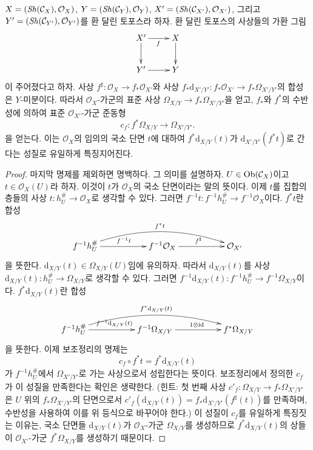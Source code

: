 \begin{lemma}
\label{lemma-functoriality-differentials-ringed-topoi}
$X = (\mathop{\mathit{Sh}}\nolimits(\mathcal{C}_X), \mathcal{O}_X)$,
$Y = (\mathop{\mathit{Sh}}\nolimits(\mathcal{C}_Y), \mathcal{O}_Y)$,
$X' = (\mathop{\mathit{Sh}}\nolimits(\mathcal{C}_{X'}), \mathcal{O}_{X'})$, 그리고
$Y' = (\mathop{\mathit{Sh}}\nolimits(\mathcal{C}_{Y'}), \mathcal{O}_{Y'})$를 환 달린 토포스라 하자.
환 달린 토포스의 사상들의 가환 그림
$$
\xymatrix{
X' \ar[d] \ar[r]_f & X \ar[d] \\
Y' \ar[r] & Y
}
$$
이 주어졌다고 하자. 사상
$f^\sharp : \mathcal{O}_X \to f_*\mathcal{O}_{X'}$와 사상
$f_*\text{d}_{X'/Y'} : f_*\mathcal{O}_{X'} \to f_*\Omega_{X'/Y'}$의
합성은 $Y$-미분이다. 따라서 $\mathcal{O}_X$-가군의 표준 사상
$\Omega_{X/Y} \to f_*\Omega_{X'/Y'}$을 얻고, $f_*$와 $f^*$의
수반성에 의하여 표준 $\mathcal{O}_{X'}$-가군 준동형
$$
c_f : f^*\Omega_{X/Y} \longrightarrow \Omega_{X'/Y'}.
$$
을 얻는다. 이는 $\mathcal{O}_X$의 임의의 국소 단면 $t$에 대하여
$f^*\text{d}_{X/Y}(t)$가 $\text{d}_{X'/Y'}(f^* t)$로 간다는 성질로
유일하게 특징지어진다.
\end{lemma}

\begin{proof}
마지막 명제를 제외하면 명백하다. 그 의미를 설명하자.
$U \in \mathop{\mathrm{Ob}}\nolimits(\mathcal{C}_X)$이고 $t \in \mathcal{O}_X(U)$라 하자.
이것이 $t$가 $\mathcal{O}_X$의 국소 단면이라는 말의 뜻이다.
이제 $t$를 집합의 층들의 사상
$t : h_U^\# \to \mathcal{O}_X$로 생각할 수 있다. 그러면
$f^{-1}t : f^{-1}h_U^\# \to f^{-1}\mathcal{O}_X$이다.
$f^*t$란 합성
$$
\xymatrix{
f^{-1}h_U^\# \ar[rr]^{f^{-1}t} \ar@/^4ex/[rrrr]^{f^*t} & &
f^{-1}\mathcal{O}_X \ar[rr]^{f^\sharp} & &
\mathcal{O}_{X'}
}
$$
을 뜻한다. $\text{d}_{X/Y}(t) \in \Omega_{X/Y}(U)$임에 유의하자.
따라서 $\text{d}_{X/Y}(t)$를 사상
$\text{d}_{X/Y}(t) : h_U^\# \to \Omega_{X/Y}$로 생각할 수 있다.
그러면 $f^{-1}\text{d}_{X/Y}(t) : f^{-1}h_U^\# \to
f^{-1}\Omega_{X/Y}$이다. $f^*\text{d}_{X/Y}(t)$란 합성
$$
\xymatrix{
f^{-1}h_U^\#
\ar[rr]^{f^{-1}\text{d}_{X/Y}(t)}
\ar@/^4ex/[rrrr]^{f^*\text{d}_{X/Y}(t)} & &
f^{-1}\Omega_{X/Y} \ar[rr]^{1 \otimes \text{id}} & &
f^*\Omega_{X/Y}
}
$$
을 뜻한다. 이제 보조정리의 명제는
$$
c_f \circ f^*t = f^*\text{d}_{X/Y}(t)
$$
가 $f^{-1}h_U^\#$에서 $\Omega_{X'/Y'}$로 가는 사상으로서 성립한다는
뜻이다. 보조정리에서 정의한 $c_f$가 이 성질을 만족한다는 확인은
생략한다. (힌트: 첫 번째 사상
$c'_f : \Omega_{X/Y} \to f_*\Omega_{X'/Y'}$은 $U$ 위의
$f_*\Omega_{X'/Y'}$의 단면으로서
$c'_f(\text{d}_{X/Y}(t)) = f_*\text{d}_{X'/Y'}(f^\sharp(t))$를 만족하며,
수반성을 사용하여 이를 위 등식으로 바꾸어야 한다.) 이 성질이 $c_f$를
유일하게 특징짓는 이유는, 국소 단면들 $\text{d}_{X/Y}(t)$가
$\mathcal{O}_X$-가군 $\Omega_{X/Y}$를 생성하므로
$f^*\text{d}_{X/Y}(t)$의 상들이 $\mathcal{O}_{X'}$-가군
$f^*\Omega_{X/Y}$를 생성하기 때문이다.
\end{proof}





